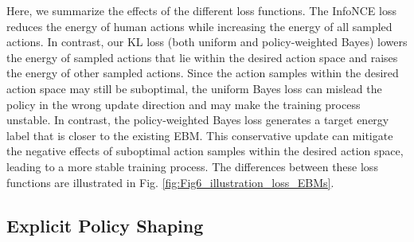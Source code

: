 Here, we summarize the effects of the different loss functions. The InfoNCE loss reduces the energy of human actions while increasing the energy of all sampled actions.
In contrast, our KL loss (both uniform and policy-weighted Bayes) lowers the energy of sampled actions that lie within the desired action space and raises the energy of other sampled actions.
Since the action samples within the desired action space may still be suboptimal, the uniform Bayes loss can mislead the policy in the wrong update direction and may make the training process unstable. In contrast, the policy-weighted Bayes loss generates a target energy label that is closer to the existing EBM. 
This conservative update can mitigate the negative effects of suboptimal action samples within the desired action space, leading to a more stable training process. The differences between these loss functions are illustrated in Fig. \ref{fig:Fig6_illustration_loss_EBMs}.


\subsection{Explicit Policy Shaping}
\label{sec:sub:explicit_policy_shaping}

